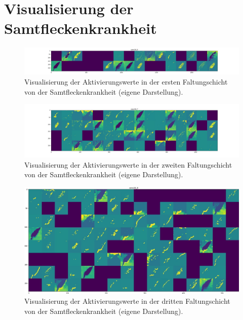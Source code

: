 \chapter{Visualisierung der Samtfleckenkrankheit}
\label{anahngd}
\begin{figure}[h!]
	\centering
	\includegraphics[width=\textwidth]{visualisierungen/leaf_mold/activation/mold0.JPG}
	\caption{Visualisierung der Aktivierungswerte in der ersten Faltungschicht von der Samtfleckenkrankheit (eigene Darstellung).}
	\label{}
\end{figure}

\begin{figure}[h!]
	\centering
	\includegraphics[width=\textwidth]{visualisierungen/leaf_mold/activation/mold3.JPG}
	\caption{Visualisierung der Aktivierungswerte in der zweiten Faltungschicht von der Samtfleckenkrankheit (eigene Darstellung).}
	\label{}
\end{figure}

\begin{figure}[h!]
	\centering
	\includegraphics[width=\textwidth]{visualisierungen/leaf_mold/activation/mold6.JPG}
	\caption{Visualisierung der Aktivierungswerte in der dritten Faltungschicht von der Samtfleckenkrankheit (eigene Darstellung).}
	\label{}
\end{figure}

